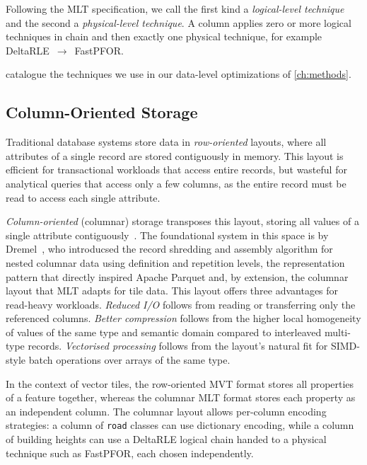 Following the MLT specification, we call the first kind a \emph{logical-level technique} and the second a \emph{physical-level technique}.
A column applies zero or more logical techniques in chain and then exactly one physical technique, for example DeltaRLE~$\rightarrow$~FastPFOR.

 catalogue the techniques we use in our data-level optimizations of \cref{ch:methods}.

\subsection{Column-Oriented Storage}\label{sub:column_storage}

Traditional database systems store data in \emph{row-oriented} layouts, where all attributes of a single record are stored contiguously in memory.
This layout is efficient for transactional workloads that access entire records, but wasteful for analytical queries that access only a few columns, as the entire record must be read to access each single attribute.

\emph{Column-oriented} (columnar) storage transposes this layout, storing all values of a single attribute contiguously~\cite{abadiDesignImplementationModern2013}.
The foundational system in this space is by Dremel~\cite{melnikDremelInteractiveAnalysis}, who introducsed the record shredding and assembly algorithm for nested columnar data using definition and repetition levels, the representation pattern that directly inspired Apache Parquet and, by extension, the columnar layout that \ac{MLT} adapts for tile data.
This layout offers three advantages for read-heavy workloads. \emph{Reduced I/O} follows from reading or transferring only the referenced columns. \emph{Better compression} follows from the higher local homogeneity of values of the same type and semantic domain compared to interleaved multi-type records. \emph{Vectorised processing} follows from the layout's natural fit for \ac{SIMD}-style batch operations over arrays of the same type.

In the context of vector tiles, the row-oriented \ac{MVT} format stores all properties of a feature together, whereas the columnar \ac{MLT} format stores each property as an independent column.
The columnar layout allows per-column encoding strategies:
a column of \texttt{road} classes can use dictionary encoding, while a column of building heights can use a DeltaRLE logical chain handed to a physical technique such as FastPFOR, each chosen independently.


